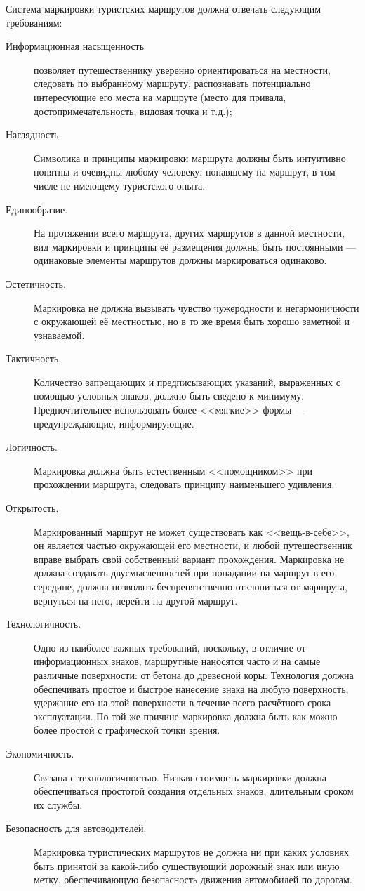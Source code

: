 \documentclass[a4paper,12pt,titlepage]{extarticle}
\begin{document}
Система маркировки туристских маршрутов должна отвечать следующим требованиям:
\begin{description}
	\item[Информационная насыщенность] позволяет путешественнику уверенно ориентироваться на местности, следовать по
		выбранному маршруту, распознавать потенциально интересующие его места на маршруте (место для привала,
		достопримечательность, видовая точка и т.д.);
	\item[Наглядность.] Символика и принципы маркировки маршрута должны быть интуитивно понятны и очевидны любому
		человеку, попавшему на маршрут, в том числе не имеющему туристского опыта.
	\item[Единообразие.] На протяжении всего маршрута, других маршрутов в данной местности, вид маркировки и
		принципы её размещения должны быть постоянными --- одинаковые элементы маршрутов должны маркироваться
		одинаково.
	\item[Эстетичность.] Маркировка не должна вызывать чувство чужеродности и негармоничности с окружающей её
		местностью, но в то же время быть хорошо заметной и узнаваемой.
	\item[Тактичность.] Количество запрещающих и предписывающих указаний, выраженных с помощью условных знаков,
		должно быть сведено к минимуму. Предпочтительнее использовать более <<мягкие>> формы ---
		предупреждающие, информирующие.
	\item[Логичность.] Маркировка должна быть естественным <<помощником>> при прохождении маршрута, следовать
		принципу наименьшего удивления.
	\item[Открытость.] Маркированный маршрут не может существовать как <<вещь-в-себе>>, он является частью окружающей
		его местности, и любой путешественник вправе выбрать свой собственный вариант прохождения. Маркировка не
		должна создавать двусмысленностей при попадании на маршрут в его середине, должна позволять
		беспрепятственно отклониться от маршрута, вернуться на него, перейти на другой маршрут.
	\item[Технологичность.] Одно из наиболее важных требований, поскольку, в отличие от информационных знаков,
		маршрутные наносятся часто и на самые различные поверхности: от бетона до древесной коры.
		Технология должна обеспечивать простое и быстрое нанесение знака на любую поверхность, удержание его на
		этой поверхности в течение всего расчётного срока эксплуатации. По той же причине маркировка должна
		быть как можно более простой с графической точки зрения.
	\item[Экономичность.] Связана с технологичностью. Низкая стоимость маркировки должна обеспечиваться простотой
		создания отдельных знаков, длительным сроком их службы.
	\item[Безопасность для автоводителей.] Маркировка туристических маршрутов не должна ни при каких условиях быть
		принятой за какой-либо существующий дорожный знак или иную метку, обеспечивающую безопасность движения
		автомобилей по дорогам.
\end{description}
\end{document}

